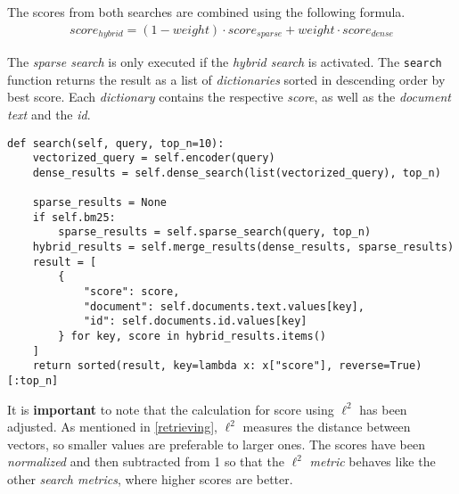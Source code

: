 \documentclass{article}
\begin{document}
The scores from both searches are combined using the following formula.
\begin{align*}
    score_{hybrid} = (1-weight) \cdot score_{sparse} + weight \cdot score_{dense}
\end{align*}

The \textit{sparse search} is only executed if the \textit{hybrid search} is activated. The \colorbox{lightgray!25}{\lstinline{search}} function returns the result as a list of \textit{dictionaries} sorted in descending order by best score. Each \textit{dictionary} contains the respective \textit{score}, as well as the \textit{document text} and the \textit{id}.

\begin{lstlisting}[backgroundcolor = \color{lightgray!25}]
def search(self, query, top_n=10):
    vectorized_query = self.encoder(query)
    dense_results = self.dense_search(list(vectorized_query), top_n)
    
    sparse_results = None
    if self.bm25:
        sparse_results = self.sparse_search(query, top_n)
    hybrid_results = self.merge_results(dense_results, sparse_results)
    result = [
        {
            "score": score, 
            "document": self.documents.text.values[key], 
            "id": self.documents.id.values[key]
        } for key, score in hybrid_results.items()
    ]
    return sorted(result, key=lambda x: x["score"], reverse=True)[:top_n]
\end{lstlisting}

It is \textbf{important} to note that the calculation for score using $\ell^{2}$ has been adjusted. As mentioned in \cref{retrieving}, $\ell^{2}$ measures the distance between vectors, so smaller values are preferable to larger ones. The scores have been \textit{normalized} and then subtracted from 1 so that the $\ell^{2}$ \textit{metric} behaves like the other \textit{search metrics}, where higher scores are better.
\end{document}
